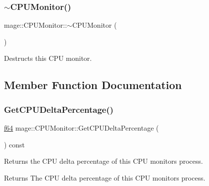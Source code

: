 \subsubsection{\texorpdfstring{$\sim$\+C\+P\+U\+Monitor()}{~CPUMonitor()}}
{\footnotesize\ttfamily mage\+::\+C\+P\+U\+Monitor\+::$\sim$\+C\+P\+U\+Monitor (\begin{DoxyParamCaption}{ }\end{DoxyParamCaption})\hspace{0.3cm}{\ttfamily [default]}}

Destructs this C\+PU monitor. 

\subsection{Member Function Documentation}
\hypertarget{classmage_1_1_c_p_u_monitor_a689c2c84c767eddef687c6221424f81d}{}\label{classmage_1_1_c_p_u_monitor_a689c2c84c767eddef687c6221424f81d} 
\subsubsection{\texorpdfstring{Get\+C\+P\+U\+Delta\+Percentage()}{GetCPUDeltaPercentage()}}
{\footnotesize\ttfamily \hyperlink{namespacemage_ab935747c6941320bd6214b5a5f265b09}{f64} mage\+::\+C\+P\+U\+Monitor\+::\+Get\+C\+P\+U\+Delta\+Percentage (\begin{DoxyParamCaption}{ }\end{DoxyParamCaption}) const\hspace{0.3cm}{\ttfamily [noexcept]}}

Returns the C\+PU delta percentage of this C\+PU monitor\textquotesingle{}s process.

\begin{DoxyReturn}{Returns}
The C\+PU delta percentage of this C\+PU monitor\textquotesingle{}s process. 
\end{DoxyReturn}
\hypertarget{classmage_1_1_c_p_u_monitor_a2a53ab21b6b4263a57e34a1d1fcd1f68}{}\label{classmage_1_1_c_p_u_monitor_a2a53ab21b6b4263a57e34a1d1fcd1f68} 
